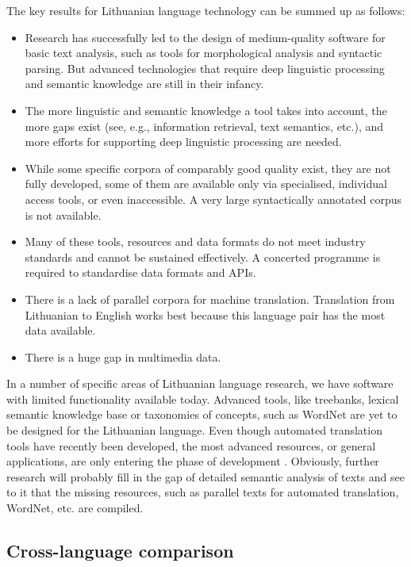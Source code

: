 \begin{multicols}{2}
The key results for Lithuanian language technology can be summed up as follows:

\begin{itemize}
\item Research has successfully led to the design of medium-quality software for basic text analysis, such as tools for morphological analysis and syntactic parsing. But advanced technologies that require deep linguistic processing and semantic knowledge are still in their infancy. 
\item The more linguistic and semantic knowledge a tool takes into account, the more gaps exist (see, e.g., information retrieval, text semantics, etc.), and more efforts for supporting deep linguistic processing are needed. 
\item While some specific corpora of comparably good quality exist, they are not fully developed, some of them are available only via specialised, individual access tools, or even inaccessible. A very large syntactically annotated corpus is not available. 
\item Many of these tools, resources and data formats do not meet industry standards and cannot be sustained effectively. A concerted programme is required to standardise data formats and APIs. 
\item There is a lack of parallel corpora for machine translation. Translation from Lithuanian to English works best because this language pair has the most data available.
\item There is a huge gap in multimedia data.
\end{itemize}

In a number of specific areas of Lithuanian language research, we have software with limited functionality available today.  Advanced tools, like treebanks, lexical semantic knowledge base or taxonomies of concepts, such as WordNet are yet to be designed for the Lithuanian language. Even though automated translation tools have recently been developed, the most advanced resources, or general applications, are only entering the phase of development  \cite{td1}. Obviously, further research will probably fill in the gap of detailed semantic analysis of texts and see to it that the missing resources, such as parallel texts for automated translation, WordNet, etc. are compiled.

\subsection{Cross-language comparison}


\end{multicols}
